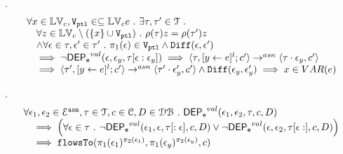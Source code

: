 \begin{lem}.
	\label{lem:inv_eval_asn}
	\[
	\begin{array}{l}
		\forall x \in \mathbb{LV}_c, \mathtt{V_{ptl}} \in \subseteq \mathbb{LV}_c e ~.~ 
		\exists \mathtt{\tau}, \mathtt{\tau}' \in \mathcal{T} ~.~ 
		\\ \quad
		\forall z \in \mathbb{LV}_c \setminus (\{x\} \cup \mathtt{V_{ptl}}) ~.~ 
		\rho(\mathtt{\tau}) z = \rho(\mathtt{\tau}') z 
		\\ \quad \land
		\forall \mathtt{\epsilon} \in \mathtt{\tau}, \mathtt{\epsilon}' \in \mathtt{\tau}' ~.~ 
		\pi_1(\mathtt{\epsilon}) \in \mathtt{V_{ptl}} \land \mathtt{Diff}(\mathtt{\epsilon}, \mathtt{\epsilon}') 
		\\ \quad
		\implies 
		\neg \mathsf{DEP_{\mathtt{e}}}^{val}(\mathtt{\epsilon}, \mathtt{\epsilon}_y, \mathtt{\tau}[\mathtt{\epsilon}:\mathtt{\epsilon}_y] ) 
		\implies
		\langle \mathtt{\tau}, [\mathrel{ y \leftarrow e }]{}^l;c' \rangle \rightarrow^{asn} \langle \mathtt{\tau}\cdot \mathtt{\epsilon}_y, c' \rangle
		\\ \quad
		\implies 
		\langle \mathtt{\tau}', [\mathrel{ y \leftarrow e }]{}^l;c' \rangle \rightarrow^{asn} \langle \mathtt{\tau}'\cdot \mathtt{\epsilon}_y',c' \rangle
		\land \mathtt{Diff}(\mathtt{\epsilon}_y, \mathtt{\epsilon}_y')
		\implies x \in VAR(e)
	\end{array}
	\]
	\end{lem}	
%
\begin{lem}.
		\label{lem:inv_indepevents}
		\[
		\begin{array}{l}
			\forall \event_1, \event_2 \in \eventset^{\asn}, \trace \in\mathcal{T}, c \in \cdom, D \in \dbdom 
			\st 
			\eventdep^{val}(\event_1, \event_2, \trace, c, D) 
			\\ \quad 
			\implies 
			\left( \forall \event \in \trace \st \neg \eventdep^{val}(\event_1, \event, \trace[:\event], c, D)
			\lor \neg \eventdep^{val}(\event, \event_2, \trace[\event:], c, D) 
			\right) 
			\\ \quad 
			\implies 
			\flowsto(\pi_1(\event_1)^{\pi_2(\event_1)}, \pi_1(\event_y)^{\pi_2(\event_y)}, c)
		\end{array}
		\]
		\end{lem}
%
